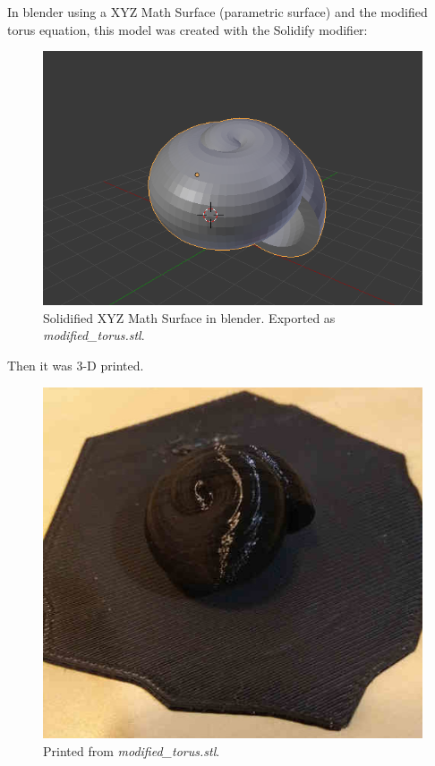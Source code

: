 \documentclass[a4paper]{article}
\begin{document}
In blender using a XYZ Math Surface (parametric surface) and the modified torus equation, this model was created with the Solidify modifier:

\begin{figure}[h]
	\centering\includegraphics[scale=1.7]{./img/modified_torus_blender.png}
	\caption{Solidified XYZ Math Surface in blender. Exported as \textit{modified\_torus.stl}.
	}
	\label{blender-modified-torus} %
\end{figure}

\pagebreak

Then it was 3-D printed.

\begin{figure}[h]
	\centering\includegraphics[scale=0.5]{./img/printed_modified_torus.jpg}
	\caption{Printed from \textit{modified\_torus.stl}.}
	\label{3d-printed-torus} %
\end{figure}
\end{document}

